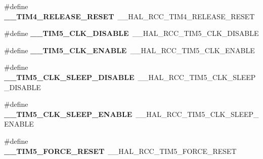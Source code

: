 \begin{DoxyCompactItemize}
\item 
\hypertarget{group___h_a_l___r_c_c___aliased_gae07e507d12b6112b856c71866d6a62f1}{\#define {\bfseries \-\_\-\-\_\-\-T\-I\-M4\-\_\-\-R\-E\-L\-E\-A\-S\-E\-\_\-\-R\-E\-S\-E\-T}~\-\_\-\-\_\-\-H\-A\-L\-\_\-\-R\-C\-C\-\_\-\-T\-I\-M4\-\_\-\-R\-E\-L\-E\-A\-S\-E\-\_\-\-R\-E\-S\-E\-T}\label{group___h_a_l___r_c_c___aliased_gae07e507d12b6112b856c71866d6a62f1}

\item 
\hypertarget{group___h_a_l___r_c_c___aliased_ga182d511999875bd31812852b1b78f4e6}{\#define {\bfseries \-\_\-\-\_\-\-T\-I\-M5\-\_\-\-C\-L\-K\-\_\-\-D\-I\-S\-A\-B\-L\-E}~\-\_\-\-\_\-\-H\-A\-L\-\_\-\-R\-C\-C\-\_\-\-T\-I\-M5\-\_\-\-C\-L\-K\-\_\-\-D\-I\-S\-A\-B\-L\-E}\label{group___h_a_l___r_c_c___aliased_ga182d511999875bd31812852b1b78f4e6}

\item 
\hypertarget{group___h_a_l___r_c_c___aliased_ga88ce7393e694b7304832f859e79bbb45}{\#define {\bfseries \-\_\-\-\_\-\-T\-I\-M5\-\_\-\-C\-L\-K\-\_\-\-E\-N\-A\-B\-L\-E}~\-\_\-\-\_\-\-H\-A\-L\-\_\-\-R\-C\-C\-\_\-\-T\-I\-M5\-\_\-\-C\-L\-K\-\_\-\-E\-N\-A\-B\-L\-E}\label{group___h_a_l___r_c_c___aliased_ga88ce7393e694b7304832f859e79bbb45}

\item 
\hypertarget{group___h_a_l___r_c_c___aliased_ga6ef0270755ff81bb2bbdfabbe4565041}{\#define {\bfseries \-\_\-\-\_\-\-T\-I\-M5\-\_\-\-C\-L\-K\-\_\-\-S\-L\-E\-E\-P\-\_\-\-D\-I\-S\-A\-B\-L\-E}~\-\_\-\-\_\-\-H\-A\-L\-\_\-\-R\-C\-C\-\_\-\-T\-I\-M5\-\_\-\-C\-L\-K\-\_\-\-S\-L\-E\-E\-P\-\_\-\-D\-I\-S\-A\-B\-L\-E}\label{group___h_a_l___r_c_c___aliased_ga6ef0270755ff81bb2bbdfabbe4565041}

\item 
\hypertarget{group___h_a_l___r_c_c___aliased_gaa24fdb3b0088008c20c6e5ecccd3f6b6}{\#define {\bfseries \-\_\-\-\_\-\-T\-I\-M5\-\_\-\-C\-L\-K\-\_\-\-S\-L\-E\-E\-P\-\_\-\-E\-N\-A\-B\-L\-E}~\-\_\-\-\_\-\-H\-A\-L\-\_\-\-R\-C\-C\-\_\-\-T\-I\-M5\-\_\-\-C\-L\-K\-\_\-\-S\-L\-E\-E\-P\-\_\-\-E\-N\-A\-B\-L\-E}\label{group___h_a_l___r_c_c___aliased_gaa24fdb3b0088008c20c6e5ecccd3f6b6}

\item 
\hypertarget{group___h_a_l___r_c_c___aliased_gaa07976dd4fea46ea3607d60c91135d57}{\#define {\bfseries \-\_\-\-\_\-\-T\-I\-M5\-\_\-\-F\-O\-R\-C\-E\-\_\-\-R\-E\-S\-E\-T}~\-\_\-\-\_\-\-H\-A\-L\-\_\-\-R\-C\-C\-\_\-\-T\-I\-M5\-\_\-\-F\-O\-R\-C\-E\-\_\-\-R\-E\-S\-E\-T}\label{group___h_a_l___r_c_c___aliased_gaa07976dd4fea46ea3607d60c91135d57}


\end{DoxyCompactItemize}
